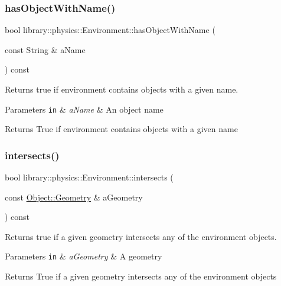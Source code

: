 \subsubsection{\texorpdfstring{has\+Object\+With\+Name()}{hasObjectWithName()}}
{\footnotesize\ttfamily bool library\+::physics\+::\+Environment\+::has\+Object\+With\+Name (\begin{DoxyParamCaption}\item[{const String \&}]{a\+Name }\end{DoxyParamCaption}) const}



Returns true if environment contains objects with a given name. 


\begin{DoxyParams}[1]{Parameters}
\mbox{\tt in}  & {\em a\+Name} & An object name \\
\hline
\end{DoxyParams}
\begin{DoxyReturn}{Returns}
True if environment contains objects with a given name 
\end{DoxyReturn}
\mbox{\label{classlibrary_1_1physics_1_1_environment_a96b2455aff4cefe7d5ce92bb008a7d51}} 
\subsubsection{\texorpdfstring{intersects()}{intersects()}}
{\footnotesize\ttfamily bool library\+::physics\+::\+Environment\+::intersects (\begin{DoxyParamCaption}\item[{const \hyperlink{classlibrary_1_1physics_1_1env_1_1_object_abdf50733c7ad97327fb64edca5670f13}{Object\+::\+Geometry} \&}]{a\+Geometry }\end{DoxyParamCaption}) const}



Returns true if a given geometry intersects any of the environment objects. 


\begin{DoxyParams}[1]{Parameters}
\mbox{\tt in}  & {\em a\+Geometry} & A geometry \\
\hline
\end{DoxyParams}
\begin{DoxyReturn}{Returns}
True if a given geometry intersects any of the environment objects 
\end{DoxyReturn}
\mbox{\label{classlibrary_1_1physics_1_1_environment_acbe2e199328ec6a3d2c233dbe8eb6359}} 
